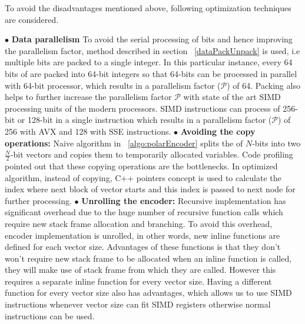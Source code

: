To avoid the disadvantages mentioned above, following optimization techniques are considered.

$\bullet$ \textbf{Data parallelism} To avoid the serial processing of bits and hence improving the parallelism factor, method described in section ~\ref{dataPackUnpack} is used, i.e multiple bits are packed to a single integer. In this particular instance, every 64 bits of are packed into 64-bit integers so that 64-bits can be processed in parallel with 64-bit processor, which results in a parallelism factor ($\mathcal{P}$) of 64. Packing also helps to further increase the parallelism factor $\mathcal{P}$ with state of the art SIMD processing units of the modern processors. SIMD instructions can process of 256-bit or 128-bit in a single instruction which results in a parallelism factor ($\mathcal{P}$) of 256 with AVX and 128 with SSE instructions. \newline
\newline
$\bullet$ \textbf{Avoiding the copy operations:} Naive algorithm in ~\ref{algo:polarEncoder} splits the of $N$-bits into two $\frac{N}{2}$-bit vectors and copies them to temporarily allocated variables. Code profiling pointed out that these copying operations are the bottlenecks. In optimized algorithm, instead of copying, C++ pointers concept is used to calculate the index where next block of vector starts and this index is passed to next node for further processing. \newline
\newline
$\bullet$ \textbf{Unrolling the encoder:} Recursive implementation has significant overhead due to the huge number of recursive function calls which require new stack frame allocation and branching. To avoid this overhead, encoder implementation is unrolled, in other words, new inline functions are defined for each vector size. Advantages of these functions is that they don't won't require new stack frame to be allocated when an inline function is called, they will make use of stack frame from which they are called. However this requires a separate inline function for every vector size. Having a different function for every vector size also has advantages, which allows us to use SIMD instructions whenever vector size can fit SIMD registers otherwise normal instructions can be used. \newline
\newline
